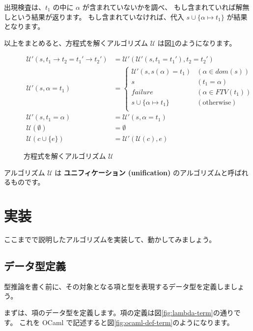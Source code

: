 出現検査は、$t_1$ の中に $\alpha$ が含まれていないかを調べ、
もし含まれていれば解無しという結果が返ります。
もし含まれていなければ、代入 $s \cup \{\alpha \mapsto t_1\}$ が結果となります。

以上をまとめると、方程式を解くアルゴリズム $\mathcal U$ は図\ref{fig:algorithm-s}のようになります。

\begin{figure}[htbp]
 \begin{align*}
  \mathcal{U'}(s, t_1 \to t_2 = t_1' \to t_2') &=
   \mathcal{U'}(\mathcal{U'}(s, t_1 = t_1'), t_2 = t_2') \\
  \mathcal{U'}(s, \alpha = t_1) &=
   \left \{
    \begin{array}{ll}
     \mathcal{U'}(s, s(\alpha) = t_1) & (\alpha \in \mathit{dom}(s)) \\
     s                                & (t_1 = \alpha) \\
     \textit{failure}                 & (\alpha \in \mathit{FTV}(t_1)) \\
     s \cup \{\alpha \mapsto t_1\}    & (\text{otherwise}) \\
    \end{array}
   \right . \\
  \mathcal{U'}(s, t_1 = \alpha) &= \mathcal{U'}(s, \alpha = t_1) \\
  \mathcal{U}(\emptyset) &= \emptyset \\
  \mathcal{U}(c \cup \{e\}) &= \mathcal{U'}(\mathcal{U}(c), e)
 \end{align*}
 \caption{方程式を解くアルゴリズム $\mathcal U$}
 \label{fig:algorithm-s}
\end{figure}

アルゴリズム $\mathcal U$ は
\textbf{ユニフィケーション (unification)} のアルゴリズムと呼ばれるものです。

\section{実装}

ここまでで説明したアルゴリズムを実装して、動かしてみましょう。

\subsection{データ型定義}

型推論を書く前に、その対象となる項と型を表現するデータ型を定義しましょう。

まずは、項のデータ型を定義します。項の定義は図\ref{fig:lambda-term}の通りです。
これを OCaml で記述すると図\ref{fig:ocaml-def-term}のようになります。

